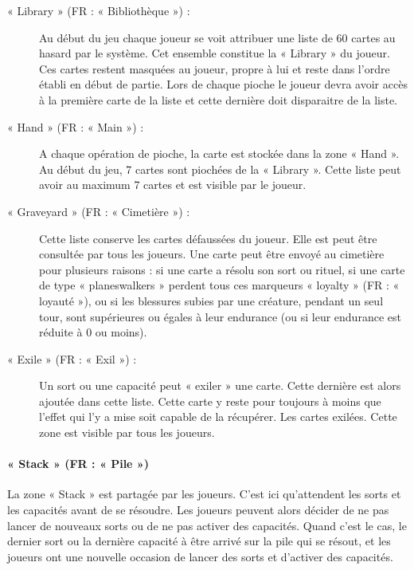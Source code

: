 \documentclass[a4paper,12pt]{article}
\begin{document}
\begin{description}

\item[« Library » (FR : « Bibliothèque ») :] Au début du jeu chaque joueur se voit attribuer une liste de 60 cartes au hasard par le système. Cet ensemble constitue la « Library » du joueur.  Ces cartes restent masquées au joueur, propre à lui et reste dans l’ordre établi en début de partie. Lors de chaque pioche le joueur devra avoir accès à la première carte de la liste et cette dernière doit disparaitre de la liste. 

\item[« Hand » (FR : « Main »)  :] A chaque opération de pioche, la carte est stockée dans la zone « Hand ». Au début du jeu, 7 cartes sont piochées de la « Library ».  Cette liste peut avoir au maximum 7 cartes et est visible par le joueur. 

\item[« Graveyard » (FR : « Cimetière ») :] Cette liste conserve les cartes défaussées du joueur. Elle est peut être consultée par tous les joueurs. Une carte peut être envoyé au cimetière pour plusieurs raisons : si une carte a résolu son sort ou rituel, si une carte de type « planeswalkers » perdent tous ces marqueurs « loyalty » (FR : « loyauté »), ou si les blessures subies par une créature, pendant un seul tour, sont supérieures ou égales à leur endurance (ou si leur endurance est réduite à 0 ou moins).

\item[« Exile » (FR : « Exil ») :] Un sort ou une capacité peut « exiler » une carte. Cette dernière est alors ajoutée dans cette liste.  
Cette carte y reste pour toujours à moins que l'effet qui l’y a mise soit capable de la récupérer. Les cartes exilées. Cette zone est visible par tous les joueurs. 


\end{description}

\paragraph{« Stack » (FR : « Pile »)}
La zone « Stack » est partagée par les joueurs. C’est ici qu’attendent les sorts et les capacités avant de se résoudre. Les joueurs peuvent alors décider de ne pas lancer de nouveaux sorts ou de ne pas
activer des capacités. Quand c'est le cas, le dernier sort ou la dernière capacité à être arrivé sur la pile qui se résout, et les joueurs ont une nouvelle occasion de lancer des sorts et d'activer des capacités.
\end{document}
